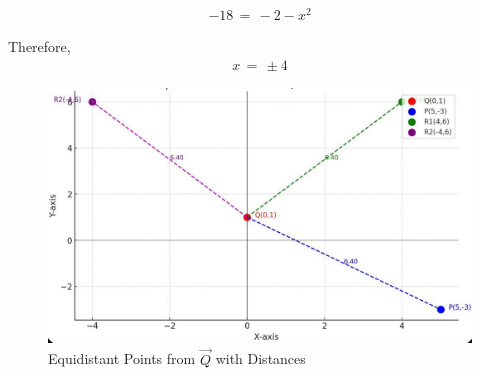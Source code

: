 \documentclass[journal,12pt,onecolumn]{IEEEtran}
\theoremstyle{remark}
\begin{document}
\begin{align}
    -18 \, = \, -2 -x^2
\end{align}

Therefore,
\begin{align}
    x \, = \, \pm 4
\end{align}

\newpage

\begin{figure}[H]
\centering
\includegraphics[width=1\columnwidth]{figs/graph.png}
 \caption*{Equidistant Points from $\vec{Q}$ with Distances}
\label{fig:graph.png}
\end{figure}
\end{document}
